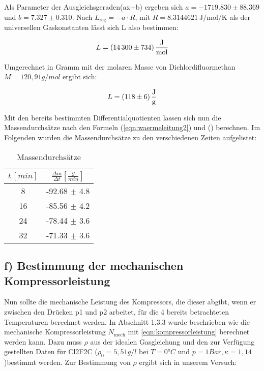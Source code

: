  Als Parameter der Ausgleichsgeraden(ax+b) ergeben sich $a=-1719.830 \pm 88.369$ und $b=7.327 \pm 0.310$.
 Nach  $L_\text{reg} = -a \cdot R$, mit 
 $R= \SI{8.3144621}{\joule\per\mol\per\kelvin}$ als der universellen Gaskonstanten  
 lässt sich L also bestimmen:
 
 \begin{equation*}
 L= \SI{14300+-734}{\joule\per\mol}
 \end{equation*}
 
 Umgerechnet in Gramm mit der molaren Masse von Dichlordifluormethan $M=120,91 g/mol$ ergibt sich:
 
 \begin{equation*}
 L = \SI{118+-6}{\joule\per\gram}
 \end{equation*}
 
 Mit den bereits bestimmten Differentialquotienten lassen sich nun die Massendurchsätze nach den Formeln (\ref{eqn:waermeleitung2}) 
 und () berechnen. Im Folgenden wurden die Massendurchsätze zu den verschiedenen Zeiten aufgelistet:
 \begin{table}
  \centering
  \label{tab:massendurchsatz}
  \begin{tabular}{c c}
  \toprule
  $t \,[min] $ & $\frac{\Delta m}{\Delta t} [\si{\frac{g}{min}}]$  \\
  \midrule
  8  & -92.68 $\pm$ 4.8 \\
  16 & -85.56 $\pm$ 4.2 \\
  24 & -78.44 $\pm$ 3.6 \\
  32 & -71.33 $\pm$ 3.6 \\
  \bottomrule
  \end{tabular}
  \caption{Massendurchsätze}
  \end{table} 
  \newpage
  \subsection*{f) Bestimmung der mechanischen Kompressorleistung}
  Nun sollte die mechanische Leistung des Kompressors, die dieser abgibt, wenn
  er zwischen den Drücken p1 und p2 arbeitet, für die 4 bereits betrachteten Temperaturen berechnet werden. In Abschnitt 
  1.3.3 wurde beschrieben wie die mechanische Kompressorleistung $N_\text{mech}$ mit \autoref{eqn:kompressorleistung} 
  berechnet werden kann. Dazu muss $\rho$ aus der idealen Gasgleichung und den zur Verfügung gestellten Daten
  für Cl2F2C ($ρ_0= 5,51 g/l$ bei $T = 0°C$ und $p = 1 Bar, κ = 1,14$)bestimmt werden. 
  Zur Bestimmung von $\rho$ ergibt sich in unserem Versuch:
  
